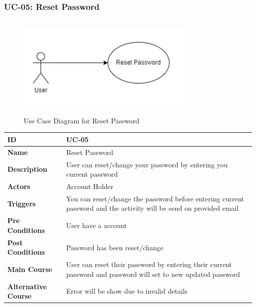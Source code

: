     \subsubsection{UC-05: Reset Password}
    \begin{figure}[H]
        \includegraphics[height=5cm, width=0.8\textwidth]{./diagrams/Use Case/u5.png}
        \centering 
        \caption{Use Case Diagram for Reset Password}
        \label{fig:Usecase1}
        \end{figure}
        
    \begin{center}
        \begin{tabularx}{\textwidth}{|l|X|}
            \hline
            \textbf{ID} & UC-05 \\
            \hline
            \textbf{Name} & Reset Password \\
            \hline
            \textbf{Description} & User can reset/change your password by entering you current password \\
            \hline
            \textbf{Actors} & Account Holder \\
            \hline
            \textbf{Triggers} & You can reset/change the password before entering current password and the activity will be send on provided email\\
            \hline
            \textbf{Pre Conditions} & User have a account \\
            \hline
            \textbf{Post Conditions} & Password has been reset/change \\
            \hline
            \textbf{Main Course} & User can reset their password by entering their current password and password will set to new updated password \\
            \hline
            \textbf{Alternative Course} & Error will be show due to invalid details \\
            \hline
            
        \end{tabularx}
    \end{center}
    \newpage
    

